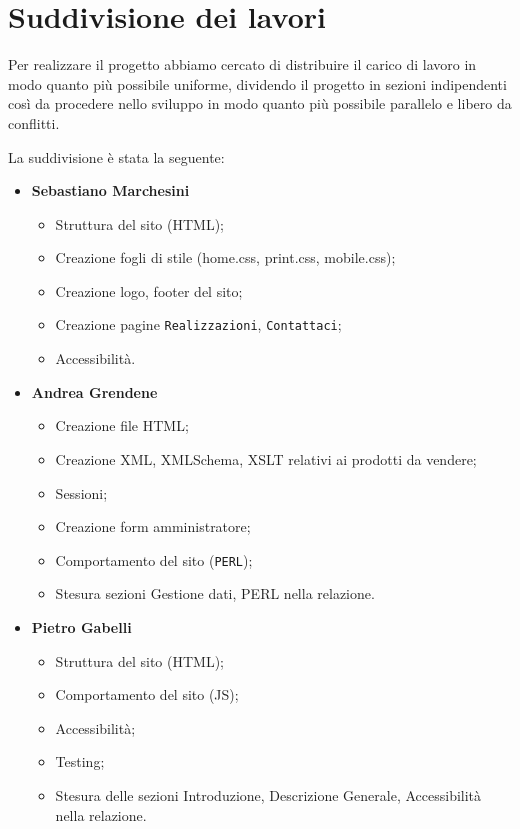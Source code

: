 \section{Suddivisione dei lavori}{
	Per realizzare il progetto abbiamo cercato di distribuire il carico di lavoro in modo quanto più possibile uniforme, dividendo il progetto in sezioni indipendenti così da procedere nello sviluppo in modo quanto più possibile parallelo e libero da conflitti.
	
	La suddivisione è stata la seguente: 	
	\begin{itemize}\itemsep1pt
		\item \textbf{Sebastiano Marchesini} 
		\begin{itemize}\itemsep1pt
			\item Struttura del sito (HTML);
			\item Creazione fogli di stile (home.css, print.css, mobile.css);
			\item Creazione logo, footer del sito;
			\item Creazione pagine \texttt{Realizzazioni}, \texttt{Contattaci};
			\item Accessibilità.
		\end{itemize}
		\item \textbf{Andrea Grendene}
		\begin{itemize}\itemsep1pt
			\item Creazione file HTML;
			\item Creazione XML, XMLSchema, XSLT relativi ai prodotti da vendere;
			\item Sessioni;
			\item Creazione form amministratore;
			\item Comportamento del sito (\texttt{PERL});
			\item Stesura sezioni Gestione dati, PERL nella relazione.
		\end{itemize}
		\item \textbf{Pietro Gabelli}
		\begin{itemize}\itemsep1pt
			\item Struttura del sito (HTML);
			\item Comportamento del sito (JS);
			\item Accessibilità;
			\item Testing;
			\item Stesura delle sezioni Introduzione, Descrizione Generale, Accessibilità nella relazione.
		\end{itemize}
	\end{itemize}
}